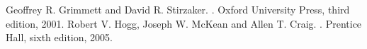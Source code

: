 \begin{thebibliography}{1}
Geoffrey R. Grimmett and David R. Stirzaker.
.
\newblock Oxford University Press, third edition, 2001.
Robert V. Hogg, Joseph W. McKean and Allen T. Craig.
.
\newblock Prentice Hall, sixth edition, 2005.
\end{thebibliography}


